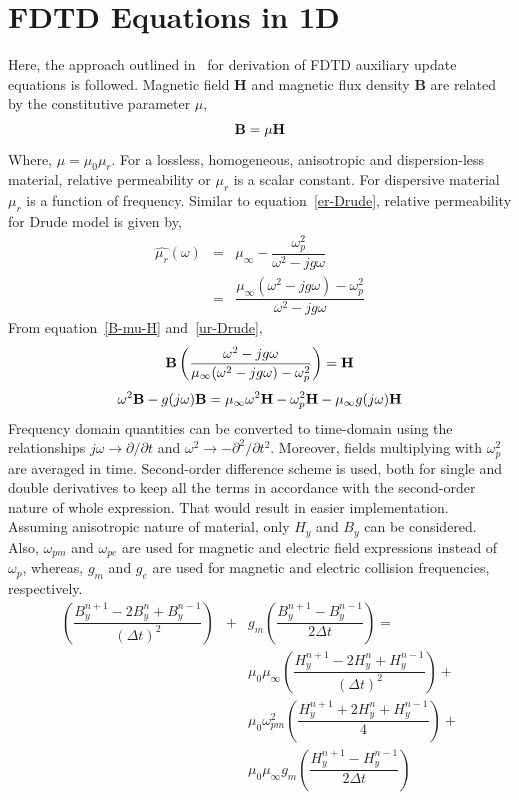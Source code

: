\section{FDTD Equations in 1D}
Here, the approach outlined in~\cite{Radial-Zhao} for derivation of FDTD auxiliary update equations is followed. Magnetic field $\textbf{H}$ and magnetic flux density $\textbf{B}$ are related  by the constitutive parameter $\mu$,
\begin{equation}
\centering
\textbf{B} = \mu \textbf{H}
\label{B-mu-H}
\end{equation}
Where, $\mu = \mu_0 \mu_r$. For a lossless, homogeneous, anisotropic and dispersion-less material, relative permeability or $\mu_r$ is a scalar constant. For dispersive material $\mu_r$ is a function of frequency. Similar to equation~\ref{er-Drude}, relative permeability for Drude model is given by,
\begin{eqnarray}
\nonumber \hat{\mu_r}(\omega)&=&\mu_\infty-\dfrac{\omega^2_p}{\omega^2-jg\omega}\\
&=&\dfrac{\mu_\infty(\omega^2-jg\omega)-\omega^2_p}{\omega^2-jg\omega}
\label{ur-Drude}
\end{eqnarray}
From equation~\ref{B-mu-H} and~\ref{ur-Drude},
\begin{equation}
\centering
\nonumber \textbf{B} \left( \dfrac{\omega^2-jg\omega}{\mu_\infty(\omega^2-jg\omega)-\omega^2_p} \right) =\textbf{H}
\label{B-muomega-H}
\end{equation}
\begin{equation}
\centering
\omega^2\textbf{B}-g(j\omega)\textbf{B} = \mu_\infty\omega^2\textbf{H}-\omega^2_p\textbf{H}-\mu_\infty g(j\omega)\textbf{H}
\label{B-muomega-H-frequency-domain}
\end{equation}
Frequency domain quantities can be converted to time-domain using the relationships $j\omega \rightarrow \partial/\partial t$ and $\omega^2 \rightarrow - \partial^2/\partial t^2$. Moreover, fields multiplying with $\omega^2_p$ are averaged in time. Second-order difference scheme is used, both for single and double derivatives to keep all the terms in accordance with the second-order nature of whole expression. That would result in easier implementation. Assuming anisotropic nature of material, only $H_y$ and $B_y$ can be considered. Also, $\omega_{pm}$ and $\omega_{pe}$ are used for magnetic and electric field expressions instead of $\omega_p$, whereas, $g_m$ and $g_e$ are used for magnetic and electric collision frequencies, respectively.
\begin{eqnarray}
\nonumber \left(\dfrac{B^{n+1}_y-2B^n_y+B^{n-1}_y}{(\Delta t)^2}\right) &+& g_m\left(\dfrac{B^{n+1}_y-B^{n-1}_y}{2\Delta t}\right) =\\
\nonumber &&\mu_0\mu_\infty\left(\dfrac{H^{n+1}_y-2H^n_y+H^{n-1}_y}{(\Delta t)^2}\right)+\\
\nonumber && \mu_0\omega^2_{pm}\left(\dfrac{H^{n+1}_y+2H^n_y+H^{n-1}_y}{4}\right)+\\
&& \mu_0\mu_\infty g_m\left(\dfrac{H^{n+1}_y-H^{n-1}_y}{2\Delta t}\right)
\label{2nd-order-B-H}
\end{eqnarray}
